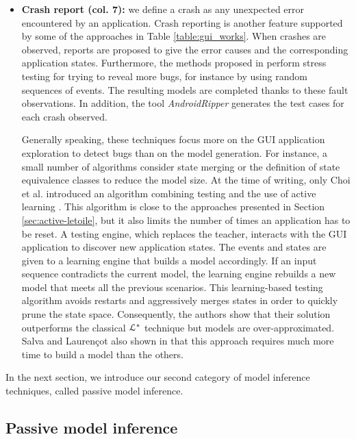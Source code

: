 \begin{itemize}
	\item \textbf{Crash report (col. 7):} we define a crash as
	any unexpected error encountered by an application.  Crash
	reporting is another feature supported by some of the
	approaches in Table \ref{table:gui_works}.  When crashes
	are observed, reports are proposed to give the error causes
	and the corresponding application states. Furthermore, the
	methods proposed in
	\cite{MobiGUITARIEEESoftware2014,guitar,SP15} perform stress
	testing for trying to reveal more bugs,  for instance by
	using random sequences of events. The resulting models are
	completed thanks to these fault observations. In addition,
	the tool \textit{AndroidRipper}
	\cite{Amalfitano:2012:UGR:2351676.2351717} generates the test
	cases for each crash observed.

	Generally speaking, these techniques focus more on the GUI
	application exploration to detect bugs than on the model
	generation. For instance, a small number of algorithms consider state
	merging or the definition of state equivalence classes to
	reduce the model size. At the time of writing, only Choi et
	al. introduced an algorithm combining testing and the use
	of active learning \cite{Choi2013}. This algorithm is close
	to the approaches presented in Section
	\ref{sec:active-letoile}, but it also limits the number of
	times an application has to be reset. A testing engine, which
	replaces the teacher, interacts with the GUI application to
	discover new application states. The events and states are
	given to a learning engine that builds a model accordingly.
	If an input sequence contradicts the current model, the
	learning engine rebuilds a new model that meets all the
	previous scenarios.  This learning-based testing algorithm
	avoids restarts and aggressively merges states in order to
	quickly prune the state space. Consequently, the authors show
	that their solution outperforms the classical
	$\EuScript{L}^*$ technique but models are over-approximated.
	Salva and Laurençot also shown in \cite{SP15} that this
	approach requires much more time to build a model than the
	others.
\end{itemize}

In the next section, we introduce our second category of model
inference techniques, called passive model inference.


\subsection{Passive model inference}
\label{sec:passive}

